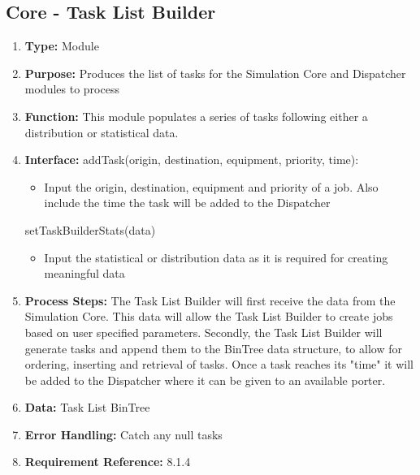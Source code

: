 \documentclass[paper=letter, fontsize=10pt]{scrartcl}
\numberwithin{equation}{section}		%
\numberwithin{figure}{section}			%
\numberwithin{table}{section}				%
\begin{document}
\subsection{Core - Task List Builder}
\begin{enumerate}[]
	\item \textbf{Type:} Module
	\item \textbf{Purpose:} Produces the list of tasks for the Simulation Core and Dispatcher modules to process
	\item \textbf{Function:} This module populates a series of tasks following either a distribution or statistical data.
	\item \textbf{Interface:} \newline
		addTask(origin, destination, equipment, priority, time):
		\begin{itemize}
			\item Input the origin, destination, equipment and priority of a job.  Also include the time the task will be added to the Dispatcher
		\end{itemize}
		setTaskBuilderStats(data)
		\begin{itemize}
			\item Input the statistical or distribution data as it is required for creating meaningful data
		\end{itemize}
		
	\item \textbf{Process Steps:} The Task List Builder will first receive the data from the Simulation Core.  This data will allow the Task List Builder to create jobs based on user specified parameters.  Secondly, the Task List Builder will generate tasks and append them to the BinTree data structure, to allow for ordering, inserting and retrieval of tasks.  Once a task reaches its "time" it will be added to the Dispatcher where it can be given to an available porter.
	\item \textbf{Data:} Task List BinTree
	\item \textbf{Error Handling:} Catch any null tasks
	\item \textbf{Requirement Reference:} 8.1.4
\end{enumerate}
\end{document}
